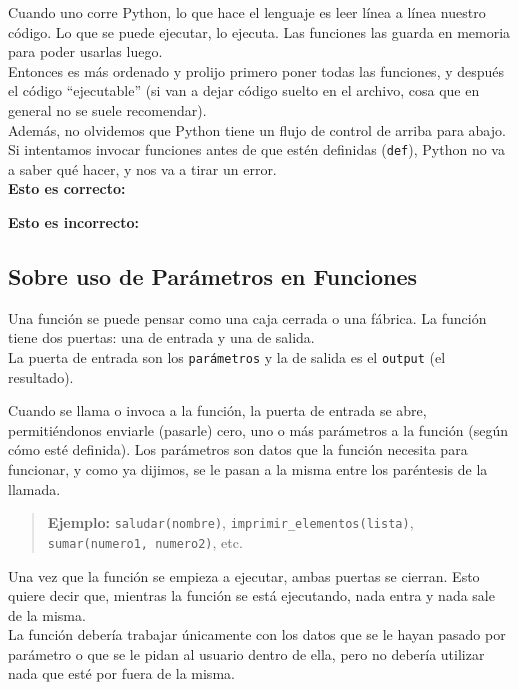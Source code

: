 \documentclass[
  letterpaper,
  DIV=11,
  numbers=noendperiod]{scrreprt}
\begin{document}
Cuando uno corre Python, lo que hace el lenguaje es leer línea a línea
nuestro código. Lo que se puede ejecutar, lo ejecuta. Las funciones las
guarda en memoria para poder usarlas luego.\\
Entonces es más ordenado y prolijo primero poner todas las funciones, y
después el código ``ejecutable'' (si van a dejar código suelto en el
archivo, cosa que en general no se suele recomendar).\\

Además, no olvidemos que Python tiene un flujo de control de arriba para
abajo. Si intentamos invocar funciones antes de que estén definidas
(\texttt{def}), Python no va a saber qué hacer, y nos va a tirar un
error.\\

\textbf{Esto es correcto:}

\textbf{Esto es incorrecto:}

\subsection{Sobre uso de Parámetros en
Funciones}\label{sobre-uso-de-paruxe1metros-en-funciones}

Una función se puede pensar como una caja cerrada o una fábrica. La
función tiene dos puertas: una de entrada y una de salida.\\
La puerta de entrada son los \texttt{parámetros} y la de salida es el
\texttt{output} (el resultado).

Cuando se llama o invoca a la función, la puerta de entrada se abre,
permitiéndonos enviarle (pasarle) cero, uno o más parámetros a la
función (según cómo esté definida). Los parámetros son datos que la
función necesita para funcionar, y como ya dijimos, se le pasan a la
misma entre los paréntesis de la llamada.\\

\begin{quote}
\textbf{Ejemplo:} \texttt{saludar(nombre)},
\texttt{imprimir\_elementos(lista)}, \texttt{sumar(numero1,\ numero2)},
etc.
\end{quote}

Una vez que la función se empieza a ejecutar, ambas puertas se cierran.
Esto quiere decir que, mientras la función se está ejecutando, nada
entra y nada sale de la misma.\\
La función debería trabajar únicamente con los datos que se le hayan
pasado por parámetro o que se le pidan al usuario dentro de ella, pero
no debería utilizar nada que esté por fuera de la misma.
\end{document}
